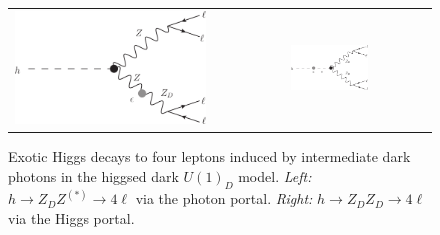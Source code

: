 \begin{figure}
\begin{center}
\begin{tabular}{ccc}
\includegraphics[width=0.4 \textwidth]{section9/plots/feynmandiagram_hzzd}
& \hspace{4mm} &
\includegraphics[width=0.4\textwidth]{section9/plots/feynmandiagram_hzdzd}
\end{tabular}
\end{center}
\caption{ Exotic Higgs decays to four leptons induced by intermediate
  dark photons in the higgsed dark $U(1)_D$ model. \emph{Left:} $h\to Z_D
  Z^{(*)} \to 4\ell$ via the photon portal. \emph{Right:} $h \to Z_D Z_D
  \to 4\ell$ via the Higgs portal. }
\label{f.ZDfeynman}
\end{figure}




